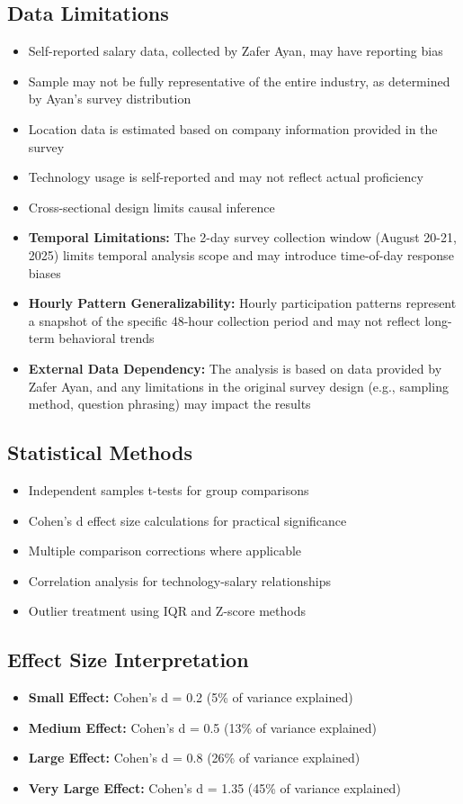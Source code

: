 \documentclass[12pt,a4paper]{article}
\begin{document}
\subsection{Data Limitations}
\begin{itemize}
    \item Self-reported salary data, collected by Zafer Ayan, may have reporting bias
    \item Sample may not be fully representative of the entire industry, as determined by Ayan’s survey distribution
    \item Location data is estimated based on company information provided in the survey
    \item Technology usage is self-reported and may not reflect actual proficiency
    \item Cross-sectional design limits causal inference
    \item \textbf{Temporal Limitations:} The 2-day survey collection window (August 20-21, 2025) limits temporal analysis scope and may introduce time-of-day response biases
    \item \textbf{Hourly Pattern Generalizability:} Hourly participation patterns represent a snapshot of the specific 48-hour collection period and may not reflect long-term behavioral trends
    \item \textbf{External Data Dependency:} The analysis is based on data provided by Zafer Ayan, and any limitations in the original survey design (e.g., sampling method, question phrasing) may impact the results
\end{itemize}

\subsection{Statistical Methods}
\begin{itemize}
    \item Independent samples t-tests for group comparisons
    \item Cohen's d effect size calculations for practical significance
    \item Multiple comparison corrections where applicable
    \item Correlation analysis for technology-salary relationships
    \item Outlier treatment using IQR and Z-score methods
\end{itemize}

\subsection{Effect Size Interpretation}
\begin{itemize}
    \item \textbf{Small Effect:} Cohen's d = 0.2 (5\% of variance explained)
    \item \textbf{Medium Effect:} Cohen's d = 0.5 (13\% of variance explained)
    \item \textbf{Large Effect:} Cohen's d = 0.8 (26\% of variance explained)
    \item \textbf{Very Large Effect:} Cohen's d = 1.35 (45\% of variance explained)
\end{itemize}
\end{document}
